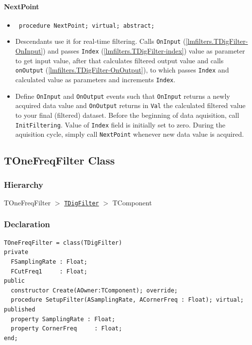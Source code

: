 \documentclass[12pt,a4paper,oneside]{report}
\newcommand{\declarationitem}[1]{{\addfontfeatures{FakeSlant} #1}}
\newcommand{\descriptiontitle}[1]{{\addfontfeatures{FakeSlant}#1}}
\newcommand{\code}[1]{\texttt{#1}}
\begin{document}
\paragraph{NextPoint}
\label{lmfilters.TDigFilter-NextPoint}
\begin{itemize}\item[\declarationitem{Declaration}\hfill]
	\begin{flushleft}
		\code{
			procedure NextPoint; virtual; abstract;}
	\end{flushleft}
	\item[\descriptiontitle{Description}] Descendants use it for real-time filtering. Calls \code{OnInput} (\ref{lmfilters.TDigFilter-OnInput}) and passes \code{Index} (\ref{lmfilters.TDigFilter-index}) value as parameter to get input value, after that calculates filtered output value and calls \code{onOutput} (\ref{lmfilters.TDigFilter-OnOutput}), to which passes \code{Index} and calculated value as parameters and increments \code{Index}.
	\item[\descriptiontitle{How to use.}] Define \code{OnInput} and \code{OnOutput} events such that \code{OnInput} returns a newly acquired data value and \code{OnOutput} returns in \code{Val} the calculated filtered value to your final (filtered) dataset. Before the beginning of data aquisition, call \code{InitFiltering}. Value of \code{Index} field is initially set to zero. During the aquisition cycle, simply call \code{NextPoint} whenever new data value is acquired. 
\end{itemize}

\subsection{TOneFreqFilter Class}
\label{lmfilters.TOneFreqFilter}
\subsubsection{Hierarchy}
TOneFreqFilter {$>$} \hyperref[lmfilters.TDigFilter]{\code{TDigFilter}} {$>$} TComponent
\subsubsection{Declaration}
\begin{verbatim}
TOneFreqFilter = class(TDigFilter)
private
  FSamplingRate : Float;
  FCutFreq1     : Float;
public
  constructor Create(AOwner:TComponent); override;
  procedure SetupFilter(ASamplingRate, ACornerFreq : Float); virtual;
published
  property SamplingRate : Float;
  property CornerFreq     : Float;
end;
\end{verbatim}
\end{document}
